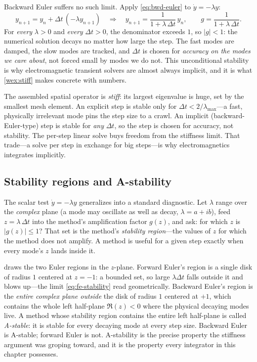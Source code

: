 Backward Euler suffers no such limit. Apply \cref{eq:bwd-euler} to $\dot y =
-\lambda y$:
\begin{equation}
  y_{n+1} = y_n + \Delta t\,(-\lambda y_{n+1})
  \quad\Longrightarrow\quad
  y_{n+1} = \frac{1}{1 + \lambda\,\Delta t}\,y_n,
  \qquad g = \frac{1}{1 + \lambda\,\Delta t}.
  \label{eq:be-scalar}
\end{equation}
For \emph{every} $\lambda > 0$ and \emph{every} $\Delta t > 0$, the denominator
exceeds $1$, so $|g| < 1$: the numerical solution decays no matter how large the
step. The fast modes are damped, the slow modes are tracked, and $\Delta t$ is
chosen for \emph{accuracy on the modes we care about}, not forced small by modes we
do not. This unconditional stability is why electromagnetic transient solvers are
almost always implicit, and it is what \cref{wex:stiff} makes concrete with
numbers.

\begin{keyidea}
The assembled spatial operator is \emph{stiff}: its largest eigenvalue is huge, set
by the smallest mesh element. An explicit step is stable only for $\Delta t <
2/\lambda_{\max}$---a fast, physically irrelevant mode pins the step size to a
crawl. An implicit (backward-Euler-type) step is stable for \emph{any} $\Delta t$,
so the step is chosen for accuracy, not stability. The per-step linear solve buys
freedom from the stiffness limit. That trade---a solve per step in exchange for big
steps---is why electromagnetics integrates implicitly.
\end{keyidea}

\subsection{Stability regions and A-stability}

The scalar test $\dot y = -\lambda y$ generalizes into a standard diagnostic. Let
$\lambda$ range over the \emph{complex} plane (a mode may oscillate as well as
decay, $\lambda = a + ib$), feed $z = \lambda\,\Delta t$ into the method's
amplification factor $g(z)$, and ask: for which $z$ is $|g(z)| \le 1$? That set is
the method's \emph{stability region}---the values of $z$ for which the method does
not amplify. A method is useful for a given step exactly when every mode's $z$
lands inside it.

 draws the two Euler regions in the $z$-plane. Forward Euler's
region is a single disk of radius $1$ centered at $z = -1$: a bounded set, so
large $\lambda\Delta t$ falls outside it and blows up---the limit
\cref{eq:fe-stability} read geometrically. Backward Euler's region is the
\emph{entire complex plane outside} the disk of radius $1$ centered at $+1$, which
contains the whole left half-plane $\Re(z) < 0$ where the physical decaying modes
live. A method whose stability region contains the entire left half-plane is called
\emph{A-stable}: it is stable for every decaying mode at every step size. Backward
Euler is A-stable; forward Euler is not. A-stability is the precise property the
stiffness argument was groping toward, and it is the property every integrator in
this chapter possesses.

